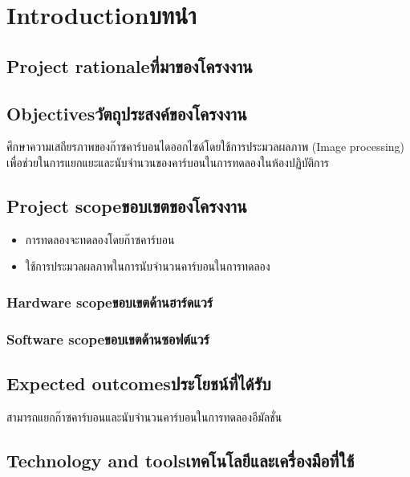 \chapter{\ifenglish Introduction\else บทนำ\fi}

\section{\ifenglish Project rationale\else ที่มาของโครงงาน\fi}

\section{\ifenglish Objectives\else วัตถุประสงค์ของโครงงาน\fi}
\hspace{0.9 cm}ศึกษาความเสถียรภาพของก๊าซคาร์บอนไดออกไซด์โดยใช้การประมวลผลภาพ (Image processing) เพื่อช่วยในการแยกแยะและนับจำนวนของคาร์บอนในการทดลองในห้องปฏิบัติการ

\section{\ifenglish Project scope\else ขอบเขตของโครงงาน\fi}
\begin{itemize}
    \item{การทดลองจะทดลองโดยก๊าซคาร์บอน}
    \item{ใช้การประมวลผลภาพในการนับจำนวนคาร์บอนในการทดลอง}
\end{itemize}

\subsection{\ifenglish Hardware scope\else ขอบเขตด้านฮาร์ดแวร์\fi}

\subsection{\ifenglish Software scope\else ขอบเขตด้านซอฟต์แวร์\fi}

\section{\ifenglish Expected outcomes\else ประโยชน์ที่ได้รับ\fi}
\hspace{0.9 cm}สามารถแยกก๊าซคาร์บอนและนับจำนวนคาร์บอนในการทดลองอีมัลชั่น

\section{\ifenglish Technology and tools\else เทคโนโลยีและเครื่องมือที่ใช้\fi}

